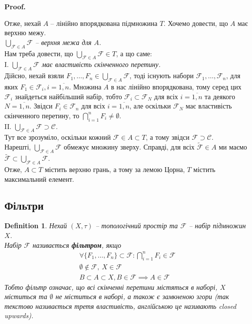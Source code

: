 \documentclass[a4paper, 10pt]{article}
\makeatletter
\theoremstyle{theoremdd}
\newtheorem{definition}[theorem]{Definition}
\renewenvironment{proof}[1][Proof.\\]{\par
\pushQED{\hfill \qed}%
\normalfont \topsep6\p@\@plus6\p@\relax
\trivlist
\item\relax
{\bfseries
#1\@addpunct{.}}\hspace\labelsep\ignorespaces
}{%
\popQED\endtrivlist\@endpefalse
}
\makeatother
\begin{document}
\begin{proof}
Отже, нехай $A$ -- лінійно впорядкована підмножина $T$. Хочемо довести, що $A$ має верхню межу.\\
\textit{$\displaystyle\bigcup_{\mathcal{F} \in A} \mathcal{F}$ -- верхня межа для $A$.}\\
Нам треба довести, що $\displaystyle\bigcup_{\mathcal{F} \in A} \mathcal{F} \in T$, а що саме:\\
I. \textit{$\displaystyle\bigcup_{\mathcal{F} \in A} \mathcal{F}$ має властивість скінченного перетину.}\\
Дійсно, нехай взяли $F_1,\dots,F_n \in \displaystyle\bigcup_{\mathcal{F} \in A} \mathcal{F}$, тоді існують набори $\mathcal{F}_1,\dots,\mathcal{F}_n$, для яких $F_1 \in \mathcal{F}_i, i = \overline{1,n}$. Множина $A$ в нас лінійно впорядкована, тому серед цих $\mathcal{F}_i$ знайдеться найбільший набір, тобто $\mathcal{F}_i \subset \mathcal{F}_N$ для всіх $i = \overline{1,n}$ та деякого $N = \overline{1,n}$. Звідси $F_i \in \mathcal{F}_n$ для всіх $i = \overline{1,n}$, але оскільки $\mathcal{F}_N$ має властивість скінченного перетину, то $\displaystyle\bigcap_{i=1}^n F_i \neq \emptyset$.\\
II. \textit{$\displaystyle\bigcup_{\mathcal{F} \in A} \mathcal{F} \supset \mathcal{C}$.}\\
Тут все зрозуміло, оскільки кожний $\mathcal{F} \in A \subset T$, а тому звідси $\mathcal{F} \supset \mathcal{C}$.\\
Нарешті, $\displaystyle\bigcup_{\mathcal{F} \in A} \mathcal{F}$ обмежує множину зверху. Справді, для всіх $\tilde{\mathcal{F}} \in A$ ми маємо $\tilde{\mathcal{F}} \subset \displaystyle\bigcup_{\mathcal{F} \in A } \mathcal{F}$.\\
Отже, $A \subset T$ містить верхню грань, а тому за лемою Цорна, $T$ містить максимальний елемент.
\end{proof}

\subsection{Фільтри}
\begin{definition}
Нехай $(X,\tau)$ -- топологічний простір та $\mathcal{F}$ -- набір підмножин $X$.\\
Набір $\mathcal{F}$ називається \textbf{фільтром}, якщо
\begin{align*}
\forall \{F_1,\dots,F_n\} \subset \mathcal{F}: \bigcap_{i=1}^n F_i \in \mathcal{F} \\
\emptyset \notin \mathcal{F},\ X \in \mathcal{F} \\
B \subset A \subset X, B \in \mathcal{F} \implies A \in \mathcal{F}
\end{align*}
Тобто фільтр означає, що всі скінченні перетини містяться в наборі, $X$ міститься та $\emptyset$ не міститься в наборі, а також є замкненою згори (так текстово називається третя властивість, англійською це називають closed upwards).
\end{definition}
\end{document}
